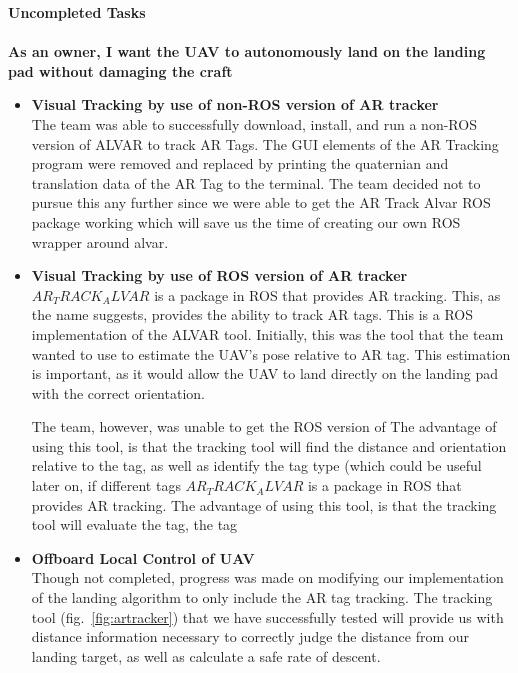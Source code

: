 \vspace{5mm}
\noindent \Large{\textbf{Uncompleted Tasks}}\\
\vspace{2mm}\\
\noindent \large{\textbf{As an owner, I want the UAV to autonomously land on the landing pad without damaging the craft}}
\normalsize
\begin{itemize}
\item \textbf{Visual Tracking by use of non-ROS version of AR tracker}\\
The team was able to successfully download, install, and run a non-ROS version of ALVAR to track AR Tags. The GUI elements of the AR Tracking program were removed and replaced by printing the quaternian and translation data of the AR Tag to the terminal.
The team decided not to pursue this any further since we were able to get the AR Track Alvar ROS package working which will save us the time of creating our own ROS wrapper around alvar.

\item \textbf{Visual Tracking by use of ROS version of AR tracker}\\
$AR_TRACK_ALVAR$ is a package in ROS that provides AR tracking. This, as the name suggests, provides the ability to track AR tags. This is a ROS implementation of the ALVAR tool. Initially, this was the tool that the team wanted to use to estimate the UAV's pose relative to AR tag. This estimation is important, as it would allow the UAV to land directly on the landing pad with the correct orientation. \par
The team, however, was unable to get the ROS version of The advantage of using this tool, is that the tracking tool will find the distance and orientation relative to the tag, as well as identify the tag type (which could be useful later on, if different tags 
$AR_TRACK_ALVAR$ is a package in ROS that provides AR tracking. The advantage of using this tool, is that the tracking tool will evaluate the tag, the tag 
\item \textbf{Offboard Local Control of UAV}\\
Though not completed, progress was made on modifying our implementation of the landing algorithm to only include the AR tag tracking. The tracking tool (fig.~\ref{fig:artracker}) that we have successfully tested will provide us with distance information necessary to correctly judge the distance from our landing target, as well as calculate a safe rate of descent.


\end{itemize}
